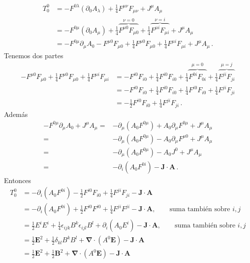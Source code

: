 \begin{frame}
\begin{align}
T^0_0 &=-F^{0\lambda}(\partial_0A_\lambda)+\frac{1}{4}F^{\mu\nu}F_{\mu\nu}+J^\mu A_\mu\nonumber\\
  &=-F^{0\mu}(\partial_0A_\mu)+\frac{1}{4}\overbrace{F^{\mu0}F_{\mu0}}^{\nu=0}+\frac{1}{4}\overbrace{F^{\mu i}F_{\mu i}}^{\nu=i}+J^\mu A_\mu\nonumber\\
  &=-F^{0\mu}\partial_\mu A_0-F^{\mu0}F_{\mu0}+\frac{1}{4}F^{\mu0}F_{\mu0}+\frac{1}{4}F^{\mu i}F_{\mu i}+J^\mu A_\mu\,.
\end{align}
Tenemos dos partes
\begin{align}
  -F^{\mu0}F_{\mu0}+\frac{1}{4}F^{\mu0}F_{\mu0}+\frac{1}{4}F^{\mu i}F_{\mu i}
  &=-F^{i0}F_{i0}+\frac{1}{4}F^{i0}F_{i0}+\frac{1}{4}\overbrace{F^{0i}F_{0i}}^{\mu=0}+\frac{1}{4}\overbrace{F^{ji}F_{ji}}^{\mu=j}\nonumber\\
  &=-F^{i0}F_{i0}+\frac{1}{4}F^{i0}F_{i0}+\frac{1}{4}{F^{i0}F_{i0}}+\frac{1}{4}{F^{ji}F_{ji}}\nonumber\\
  &=-\frac{1}{2}{F^{i0}F_{i0}}+\frac{1}{4}{F^{ji}F_{ji}}\,.
\end{align}
Adem\'as
\begin{align}
  -F^{0\mu}\partial_\mu A_0+J^\mu A_\mu=&-\partial_\mu(A_0 F^{0\mu})+A_0\partial_\mu F^{0\mu}+J^\mu A_\mu\nonumber\\
  =&-\partial_\mu(A_0 F^{0\mu})-A_0\partial_\mu F^{\mu0}+J^\mu A_\mu\nonumber\\
  =&-\partial_\mu(A_0 F^{0\mu})-A_0 J^0+J^\mu A_\mu\nonumber\\
  =&-\partial_i(A_0 F^{0i})-\mathbf{J}\cdot\mathbf{A}\,.
\end{align}
Entonces
\begin{align}
  T^0_0&=-\partial_i(A_0F^{0i})-\frac{1}{2}F^{i0}F_{i0}+\frac{1}{4}F^{ji}F_{ji}-\mathbf{J}\cdot\mathbf{A}\nonumber\\
 &=-\partial_i(A_0F^{0i})+\frac{1}{2}F^{i0}F^{i0}+\frac{1}{4}F^{ji}F^{ji}-\mathbf{J}\cdot\mathbf{A},\qquad\text{suma tambi\'en sobre $i,j$}\nonumber\\
  &=\frac{1}{2}E^{i}E^{i}+\frac{1}{4}\epsilon_{ijk}B^k\epsilon_{ijl}B^l+\partial_i(A_0E^{i})-\mathbf{J}\cdot\mathbf{A},\qquad\text{suma tambi\'en sobre $i,j$}\nonumber\\
  &=\frac{1}{2}\mathbf{E}^2+\frac{1}{2}\delta_{kl}B^k B^l+\boldsymbol{\nabla}\cdot(A^0\mathbf{E})-\mathbf{J}\cdot\mathbf{A}\nonumber\\
  &=\frac{1}{2}\mathbf{E}^2+\frac{1}{2}\mathbf{B}^2+\boldsymbol{\nabla}\cdot(A^0\mathbf{E})-\mathbf{J}\cdot\mathbf{A}
\end{align}


\end{frame}
